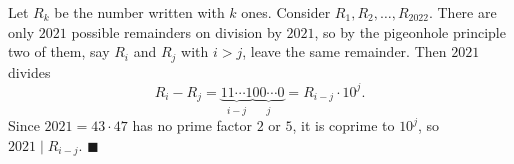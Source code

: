 Let $R_k$ be the number written with $k$ ones. Consider $R_1,R_2,\dots,R_{2022}$. There are only $2021$ possible remainders on division by $2021$, so by the pigeonhole principle two of them, say $R_i$ and $R_j$ with $i>j$, leave the same remainder. Then $2021$ divides
\[R_i-R_j=\underbrace{11\cdots1}_{i-j}\underbrace{00\cdots0}_{j}=R_{i-j}\cdot10^j.\]
Since $2021=43\cdot47$ has no prime factor $2$ or $5$, it is coprime to $10^j$, so $2021\mid R_{i-j}$. $\blacksquare$
